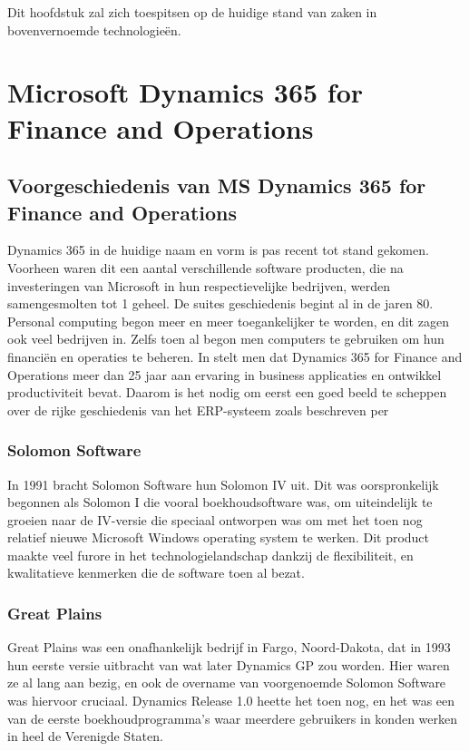 Dit hoofdstuk zal zich toespitsen op de huidige stand van zaken in bovenvernoemde technologieën.  


\section{Microsoft Dynamics 365 for Finance and Operations}
\subsection{Voorgeschiedenis van MS Dynamics 365 for Finance and Operations}
Dynamics 365 in de huidige naam en vorm is pas recent tot stand gekomen. Voorheen waren dit een aantal verschillende software producten, die na investeringen van Microsoft in hun respectievelijke bedrijven, werden samengesmolten tot 1 geheel. De suites geschiedenis begint al in de jaren 80. Personal computing begon meer en meer toegankelijker te worden, en dit zagen ook veel bedrijven in. Zelfs toen al begon men  computers te gebruiken om hun financiën en operaties te beheren. In \textcite{Olsen et al.2009} stelt men dat Dynamics 365 for Finance and Operations meer dan 25 jaar aan ervaring in business applicaties en ontwikkel productiviteit bevat. Daarom is het nodig om eerst een goed beeld te scheppen over de rijke geschiedenis van het ERP-systeem zoals beschreven per \textcite{Wright2018}

\subsubsection{Solomon Software }
In 1991 bracht Solomon Software hun Solomon IV uit. Dit was oorspronkelijk begonnen als Solomon I die vooral boekhoudsoftware was, om uiteindelijk te groeien naar de IV-versie die speciaal ontworpen was om met het toen nog relatief nieuwe Microsoft Windows operating system te werken. Dit product maakte veel furore in het technologielandschap dankzij de flexibiliteit, en kwalitatieve kenmerken die de software toen al bezat. 


\subsubsection{Great Plains }
Great Plains was een onafhankelijk bedrijf in Fargo, Noord-Dakota, dat in 1993 hun eerste versie uitbracht van wat later Dynamics GP zou worden. Hier waren ze al lang aan bezig, en ook de overname van voorgenoemde Solomon Software was hiervoor cruciaal. Dynamics Release 1.0 heette het toen nog, en het was een van de eerste boekhoudprogramma’s waar meerdere gebruikers in konden werken in heel de Verenigde Staten. 

